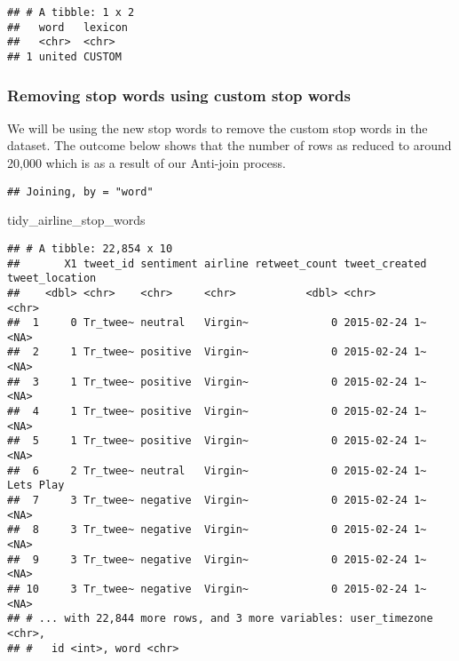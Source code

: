 \documentclass[
]{article}
\newenvironment{Shaded}{\begin{snugshade}}{\end{snugshade}}
\newcommand{\CommentTok}[1]{\textcolor[rgb]{0.56,0.35,0.01}{\textit{#1}}}
\newcommand{\DataTypeTok}[1]{\textcolor[rgb]{0.13,0.29,0.53}{#1}}
\newcommand{\KeywordTok}[1]{\textcolor[rgb]{0.13,0.29,0.53}{\textbf{#1}}}
\newcommand{\NormalTok}[1]{#1}
\newcommand{\OperatorTok}[1]{\textcolor[rgb]{0.81,0.36,0.00}{\textbf{#1}}}
\newcommand{\StringTok}[1]{\textcolor[rgb]{0.31,0.60,0.02}{#1}}
\begin{document}
\begin{verbatim}
## # A tibble: 1 x 2
##   word   lexicon
##   <chr>  <chr>  
## 1 united CUSTOM
\end{verbatim}

\hypertarget{removing-stop-words-using-custom-stop-words}{%
\subsubsection{Removing stop words using custom stop
words}\label{removing-stop-words-using-custom-stop-words}}

We will be using the new stop words to remove the custom stop words in
the dataset. The outcome below shows that the number of rows as reduced
to around 20,000 which is as a result of our Anti-join process.

\begin{Shaded}
\end{Shaded}

\begin{verbatim}
## Joining, by = "word"
\end{verbatim}

\begin{Shaded}
\begin{Highlighting}[]
\NormalTok{tidy_airline_stop_words}
\end{Highlighting}
\end{Shaded}

\begin{verbatim}
## # A tibble: 22,854 x 10
##       X1 tweet_id sentiment airline retweet_count tweet_created tweet_location
##    <dbl> <chr>    <chr>     <chr>           <dbl> <chr>         <chr>         
##  1     0 Tr_twee~ neutral   Virgin~             0 2015-02-24 1~ <NA>          
##  2     1 Tr_twee~ positive  Virgin~             0 2015-02-24 1~ <NA>          
##  3     1 Tr_twee~ positive  Virgin~             0 2015-02-24 1~ <NA>          
##  4     1 Tr_twee~ positive  Virgin~             0 2015-02-24 1~ <NA>          
##  5     1 Tr_twee~ positive  Virgin~             0 2015-02-24 1~ <NA>          
##  6     2 Tr_twee~ neutral   Virgin~             0 2015-02-24 1~ Lets Play     
##  7     3 Tr_twee~ negative  Virgin~             0 2015-02-24 1~ <NA>          
##  8     3 Tr_twee~ negative  Virgin~             0 2015-02-24 1~ <NA>          
##  9     3 Tr_twee~ negative  Virgin~             0 2015-02-24 1~ <NA>          
## 10     3 Tr_twee~ negative  Virgin~             0 2015-02-24 1~ <NA>          
## # ... with 22,844 more rows, and 3 more variables: user_timezone <chr>,
## #   id <int>, word <chr>
\end{verbatim}
\end{document}
